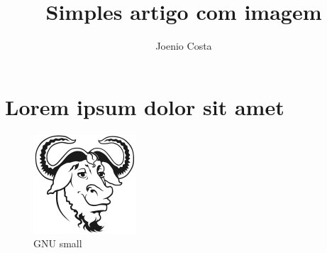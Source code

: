 \documentclass{article}
\begin{document}
\title{Simples artigo com imagem}

\author{Joenio Costa}

\maketitle

\section{Lorem ipsum dolor sit amet}

\begin{figure}[h]
\center
\includegraphics[scale=0.3]{heckert_gnu_small.png}
\caption{GNU small}
\end{figure}
\end{document}
